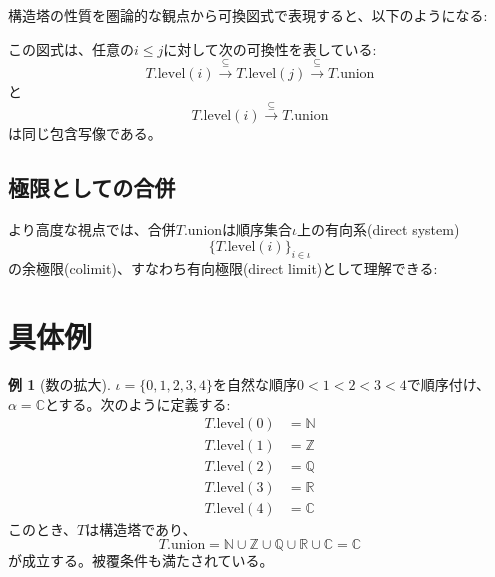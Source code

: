 \documentclass[a4paper,12pt]{article}
\theoremstyle{definition}
\newtheorem{example}[definition]{例}
\begin{document}
構造塔の性質を圏論的な観点から可換図式で表現すると、以下のようになる:

\begin{center}
\end{center}

この図式は、任意の$i \leq j$に対して次の可換性を表している:
\[
T.\text{level}(i) \xrightarrow{\subseteq} T.\text{level}(j) \xrightarrow{\subseteq} T.\text{union}
\]
と
\[
T.\text{level}(i) \xrightarrow{\subseteq} T.\text{union}
\]
は同じ包含写像である。

\subsection{極限としての合併}

より高度な視点では、合併$T.\text{union}$は順序集合$\iota$上の有向系(direct system)
\[
\{ T.\text{level}(i) \}_{i \in \iota}
\]
の余極限(colimit)、すなわち有向極限(direct limit)として理解できる:

\begin{center}
\end{center}

\section{具体例}

\begin{example}[数の拡大]
$\iota = \{0, 1, 2, 3, 4\}$を自然な順序$0 < 1 < 2 < 3 < 4$で順序付け、$\alpha = \mathbb{C}$とする。次のように定義する:
\begin{align*}
T.\text{level}(0) &= \mathbb{N} \\
T.\text{level}(1) &= \mathbb{Z} \\
T.\text{level}(2) &= \mathbb{Q} \\
T.\text{level}(3) &= \mathbb{R} \\
T.\text{level}(4) &= \mathbb{C}
\end{align*}
このとき、$T$は構造塔であり、
\[
T.\text{union} = \mathbb{N} \cup \mathbb{Z} \cup \mathbb{Q} \cup \mathbb{R} \cup \mathbb{C} = \mathbb{C}
\]
が成立する。被覆条件も満たされている。
\end{example}
\end{document}
